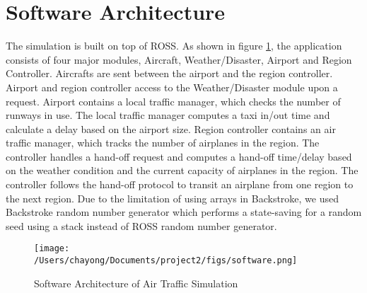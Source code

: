 \section {Software Architecture}

The simulation is built on top of ROSS. 
As shown in figure \ref{fig:software}, the application consists of four major modules, Aircraft, Weather/Disaster, Airport and Region Controller. 
Aircrafts are sent between the airport and the region controller. Airport and region controller access to the Weather/Disaster module upon a request. 
Airport contains a local traffic manager, which checks the number of runways in use. 
The local traffic manager computes a taxi in/out time and calculate a delay based on the airport size.
Region controller contains an air traffic manager, which tracks the number of airplanes in the region.
The controller handles a hand-off request and computes a hand-off time/delay based on the weather condition and the current capacity of airplanes in the region. 
The controller follows the hand-off protocol to transit an airplane from one region to the next region.  
Due to the limitation of using arrays in Backstroke, we used Backstroke random number generator which performs a state-saving for a random seed using a stack instead of ROSS random number generator.


\begin{figure} [htd]
\centering
\texttt{[image: /Users/chayong/Documents/project2/figs/software.png]}
\caption{Software Architecture of Air Traffic Simulation}
\label{fig:software}
\end{figure}

